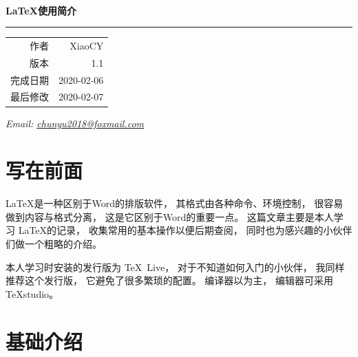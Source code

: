 \documentclass{ctexart}
\numberwithin{equation}{section}			%
\begin{document}
	\begin{titlepage}
		\ %
		
		\vspace{\fill}
		
		\begin{flushright}
			{\Huge\bfseries\LaTeX 使用简介} \\
			\rule[1em]{\linewidth}{0.5ex}
			
			\begin{tabular}{rr}
				作者 & XiaoCY \\
				版本 & 1.1 \\
				完成日期 & 2020-02-06 \\
				最后修改 & 2020-02-07 \\
			\end{tabular}
		\end{flushright}
		
		
		{\noindent\slshape Email: 
		 \href{mailto:chunyu2018@foxmail.com}
			{chunyu2018@foxmail.com}
		}
	\end{titlepage}

	
	\tableofcontents		%
	\clearpage
	
	\listoftables
	\clearpage
	
	\setcounter{page}{1}	%
	
	\section{写在前面}
	\LaTeX 是一种区别于Word的排版软件，
	其格式由各种命令、环境控制，
	很容易做到内容与格式分离，
	这是它区别于Word的重要一点。
	这篇文章主要是本人学习 \LaTeX 的记录\cite{liuhaiyang}，
	收集常用的基本操作以便后期查阅，
	同时也为感兴趣的小伙伴们做一个粗略的介绍。
	
	本人学习时安装的发行版为 \TeX~Live，
	对于不知道如何入门的小伙伴，
	我同样推荐这个发行版，
	它避免了很多繁琐的配置。
	编译器以\XeLaTeX 为主，
	编辑器可采用TeXstudio。
	
	\section{基础介绍}
\end{document}
